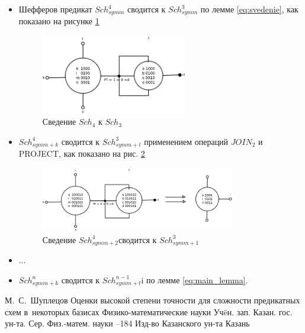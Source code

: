 \documentclass[12pt]{article}
\begin{document}
\begin{itemize}
\item Шефферов предикат $Sch_{symm}^4$ сводится к $Sch_{symm}^3$ по лемме 
\ref{eq:svedenie}, как показано на рисунке \ref{fig:4to3}
\begin{figure}[htb]
\centering
\includegraphics[width=0.6\textwidth]{4to3.png}
\caption{Сведение $Sch_4$ к $Sch_3$ }
\label{fig:4to3}
\end{figure}


\item $Sch_{symm+k}^4$ сводится к $Sch_{symm+t}^3$ применением операций $JOIN_2$ и PROJECT, как показано на рис.
\ref{fig:4_2to3_1}
\begin{figure}[htb]
\centering
\includegraphics[width=0.8\textwidth]{4_2to3_1.png}
\caption{Сведение $Sch_{symm+2}^4$сводится к $Sch_{symm+1}^3$}
\label{fig:4_2to3_1}
\end{figure}
\item $\ldots$
\item $Sch_{symm+k}^n$ сводится к $Sch_{symm+t}^{n-1}$i по лемме \ref{eq:main_lemma}.

\end{itemize}


\clearpage
{}
    \by М.~С.~Шуплецов
    \paper Оценки высокой степени точности для сложности предикатных схем в~некоторых базисах
    \inbook Физико-математические науки
    \serial Уч\"eн. зап. Казан. гос. ун-та. Сер. Физ.-матем. науки
    --184
    \publ Изд-во Казанского ун-та
    \publaddr Казань
\end{document}
